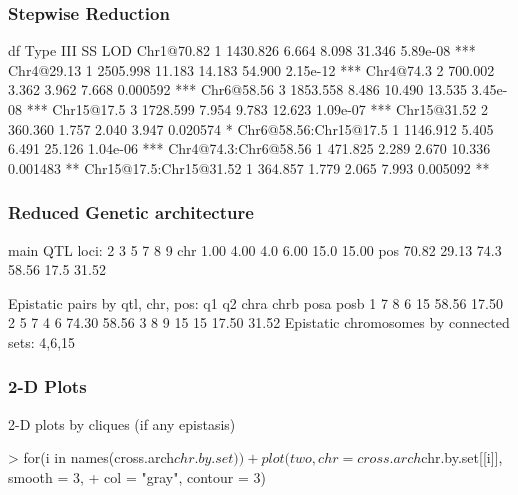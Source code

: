 \documentclass{beamer}
\begin{document}
\begin{frame}[fragile]
\frametitle{Stepwise Reduction}

\tiny

\begin{Schunk}
\begin{Soutput}
                       df Type III SS      LOD     %
Chr1@70.82              1    1430.826    6.664    8.098  31.346  5.89e-08 ***
Chr4@29.13              1    2505.998   11.183   14.183  54.900  2.15e-12 ***
Chr4@74.3               2     700.002    3.362    3.962   7.668  0.000592 ***
Chr6@58.56              3    1853.558    8.486   10.490  13.535  3.45e-08 ***
Chr15@17.5              3    1728.599    7.954    9.783  12.623  1.09e-07 ***
Chr15@31.52             2     360.360    1.757    2.040   3.947  0.020574 *  
Chr6@58.56:Chr15@17.5   1    1146.912    5.405    6.491  25.126  1.04e-06 ***
Chr4@74.3:Chr6@58.56    1     471.825    2.289    2.670  10.336  0.001483 ** 
Chr15@17.5:Chr15@31.52  1     364.857    1.779    2.065   7.993  0.005092 ** 
\end{Soutput}

\end{Schunk}
\end{frame}
\begin{frame}[fragile]
  \frametitle{Reduced Genetic architecture}

\tiny

\begin{Schunk}
\begin{Soutput}
main QTL loci:
        2     3    5     7    8     9
chr  1.00  4.00  4.0  6.00 15.0 15.00
pos 70.82 29.13 74.3 58.56 17.5 31.52

Epistatic pairs by qtl, chr, pos:
  q1 q2 chra chrb  posa  posb
1  7  8    6   15 58.56 17.50
2  5  7    4    6 74.30 58.56
3  8  9   15   15 17.50 31.52
Epistatic chromosomes by connected sets:
4,6,15 
\end{Soutput}
\end{Schunk}
\end{frame}

\begin{frame}[fragile]
  \frametitle{2-D Plots}

2-D plots by cliques (if any epistasis)

\tiny

\begin{Schunk}
\begin{Sinput}
> for(i in names(cross.arch$chr.by.set))
+   plot(two, chr = cross.arch$chr.by.set[[i]], smooth = 3,
+     col = "gray", contour = 3)
\end{Sinput}
\end{Schunk}

\end{frame}
\end{document}
